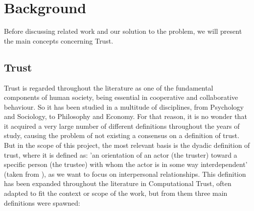 \section{Background}
\label{sec:Background}



Before discussing related work and our solution to the problem, we will present the main concepts concerning Trust.

\subsection{Trust}
\label{subsec:Trust}
Trust is regarded throughout the literature as one of the fundamental components of human society, being essential in cooperative and collaborative behaviour. So it has been studied in a multitude of disciplines, from Psychology and Sociology, to Philosophy and Economy\cite{Rousseau1998, Jones1997, Sabater2005}. For that reason, it is no wonder that it acquired a very large number of different definitions throughout the years of study, causing the problem of not existing a consensus on a definition of trust\cite{Castelfranchi2010}. But in the scope of this project, the most relevant basis is the dyadic definition of trust, where it is defined as: 'an orientation of an actor (the truster) toward a specific person (the trustee) with whom the actor is in some way interdependent' (taken from \cite{Simpson2007}), as we want to focus on interpersonal relationships. This definition has been expanded throughout the literature in Computational Trust, often adapted to fit the context or scope of the work, but from them three main definitions were spawned:
